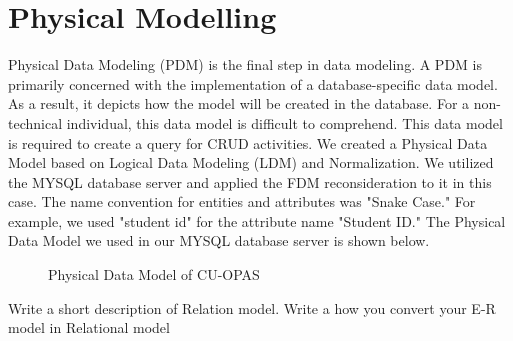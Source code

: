 \section{Physical Modelling}\label{sec:phy}
Physical Data Modeling (PDM) is the final step in data modeling. A PDM is primarily concerned with the implementation of a database-specific data model. As a result, it depicts how the model will be created in the database. For a non-technical individual, this data model is difficult to comprehend. This data model is required to create a query for CRUD activities.
We created a Physical Data Model based on Logical Data Modeling (LDM) and Normalization. We utilized the MYSQL database server and applied the FDM reconsideration to it in this case. The name convention for entities and attributes was "Snake Case." For example, we used "student id" for the attribute name "Student ID." The Physical Data Model we used in our MYSQL database server is shown below.\\

\begin{figure}[H]
	\captionsetup[subfigure]{labelformat=empty}
	\hfill
	\hfill
	\hfill
	\caption{Physical Data Model of CU-OPAS}
\end{figure}
Write a short description of Relation model. 
Write a how you convert your E-R model in Relational model
\clearpage